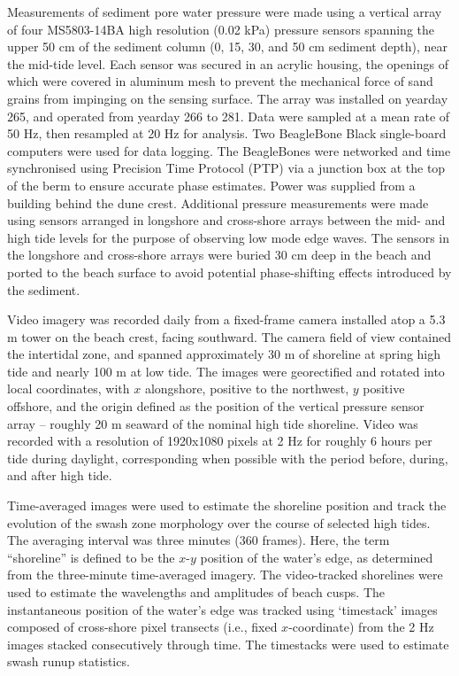 Measurements of sediment pore water pressure were made using a vertical array of four MS5803-14BA high resolution (0.02 kPa) pressure sensors spanning the upper 50 cm of the sediment column (0, 15, 30, and 50 cm sediment depth), near the mid-tide level. Each sensor was secured in an acrylic housing, the openings of which were covered in aluminum mesh to prevent the mechanical force of sand grains from impinging on the sensing surface. The array was installed on yearday 265, and operated from yearday 266 to 281. Data were sampled at a mean rate of 50 Hz, then resampled at 20 Hz for analysis. Two BeagleBone Black single-board computers were used for data logging. The BeagleBones were networked and time synchronised using Precision Time Protocol (PTP) via a junction box at the top of the berm to ensure accurate phase estimates. Power was supplied from a building behind the dune crest. Additional pressure measurements were made using sensors arranged in longshore and cross-shore arrays between the mid- and high tide levels for the purpose of observing low mode edge waves. The sensors in the longshore and cross-shore arrays were buried 30 cm deep in the beach and ported to the beach surface to avoid potential phase-shifting effects introduced by the sediment. 

Video imagery was recorded daily from a fixed-frame camera installed atop a 5.3 m tower on the beach crest, facing southward. The camera field of view contained the intertidal zone, and spanned approximately 30 m of shoreline at spring high tide and nearly 100 m at low tide. The images were georectified and rotated into local coordinates, with $x$ alongshore, positive to the northwest, $y$ positive offshore, and the origin defined as the position of the vertical pressure sensor array -- roughly 20 m seaward of the nominal high tide shoreline. Video was recorded with a resolution of 1920x1080 pixels at 2 Hz for roughly 6 hours per tide during daylight, corresponding when possible with the period before, during, and after high tide.  

Time-averaged images were used to estimate the shoreline position and track the evolution of the swash zone morphology over the course of selected high tides. The averaging interval was three minutes (360 frames). Here, the term ``shoreline'' is defined to be the $x$-$y$ position of the water's edge, as determined from the three-minute time-averaged imagery. The video-tracked shorelines were used to estimate the wavelengths and amplitudes of beach cusps. The instantaneous position of the water's edge was tracked using `timestack' images composed of cross-shore pixel transects (i.e., fixed $x$-coordinate) from the 2 Hz images stacked consecutively through time. The timestacks were used to estimate swash runup statistics.

